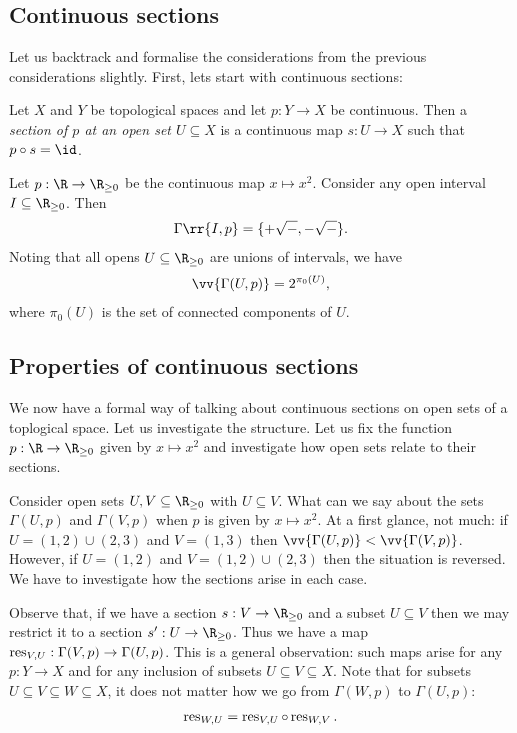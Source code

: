 \documentclass{article}
\begin{document}
\subsection{Continuous sections}

Let us backtrack and formalise the considerations from the previous
considerations slightly. First, lets start with continuous sections:

\begin{definition}
  Let $X$ and $Y$ be topological spaces and let $p:Y\to X$ be continuous.
  Then a \emph{section of $p$ at an open set $U\subseteq X$} is a continuous
  map $s:U\to X$ such that $p\circ s = \id$.
\end{definition}

\begin{example}
  Let $p : \R \to \R_{\geq 0}$ be the continuous map $x \mapsto x^2$.
  Consider any open interval $I\subseteq\R_{\geq 0}$. Then
  \begin{align*}
    \Gamma\rr{I,p} = \{+\sqrt{-}, -\sqrt{-}\}.
  \end{align*}
  Noting that all opens $U\subseteq\R_{\geq 0}$ are unions of intervals,
  we have
  \begin{align*}
    \vv{\Gamma(U,p)} = 2^{\pi_0(U)},
  \end{align*}
  where $\pi_0(U)$ is the set of connected components of $U$.
\end{example}

\subsection{Properties of continuous sections}

We now have a formal way of talking about continuous sections on
open sets of a toplogical space. Let us investigate the structure.
Let us fix the function $p:\R\to\R_{\geq 0}$ given by $x\mapsto x^2$
and investigate how open sets relate to their sections.

Consider open sets $U,V\subseteq\R_{\geq 0}$ with
$U\subseteq V$. What can we say about the sets $\Gamma(U,p)$ and
$\Gamma(V,p)$ when $p$ is given by $x\mapsto x^2$. At a first glance,
not much: if $U=(1,2)\cup(2,3)$ and $V=(1,3)$ then
$\vv{\Gamma(U,p)}<\vv{\Gamma(V,p)}$. However, if
$U=(1,2)$ and $V=(1,2)\cup(2,3)$ then the situation is reversed.
We have to investigate how the sections arise in each case.

Observe that, if we have a section $s:V\to\R_{\geq 0}$ and a subset
$U\subseteq V$ then we may restrict it to a section $s':U\to\R_{\geq 0}$.
Thus we have a map $\operatorname{res}_{V,U}:\Gamma(V,p)\to\Gamma(U,p)$. This is a
general observation: such maps arise for any $p:Y\to X$ and for
any inclusion of subsets $U\subseteq V\subseteq X$. Note that
for subsets $U\subseteq V\subseteq W\subseteq X$, it does not matter
how we go from $\Gamma(W,p)$ to $\Gamma(U,p)$:
\begin{align*}
  \operatorname{res}_{W,U} = \operatorname{res}_{V,U}\circ\operatorname{res}_{W,V}.
\end{align*}
\end{document}
